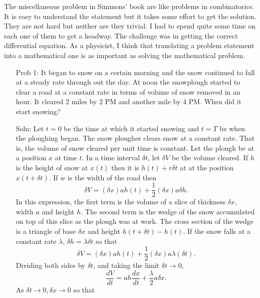 \documentclass{article}
\begin{document}
The miscellaneous problem in Simmons' book are like problems in combinatorics.
It is easy to understand the statement but it takes some effort to get the
solution. They are not hard but neither are they trivial. I had to spend quite
some time on each one of them to get a headway. The challenge was in getting 
the correct differential equation. As a physicist, I think that translating a
problem statement into a mathematical one is as important as solving the 
mathematical problem.

\begin{enumerate}
\item[Prob 1:] It began to snow on a certain morning and the snow continued 
to fall at a steady rate through out the day. At noon the snowplough started 
to clear a road at a constant rate in terms of volume of snow removed in an 
hour. It cleared 2 miles by 2 PM and another mile by 4 PM. When did it start 
snowing?
\item[Soln: ] Let $t = 0$ be the time at which it started snowing and $t = T$
be when the ploughing began. The snow plougher clears snow at a constant rate.
That is, the volume of snow cleared per unit time is constant. Let the plough
be at a position $x$ at time $t$. In a time interval $\delta t$, let $\delta V$
be the volume cleared. If $h$ is the height of snow at $x(t)$ then it is $h(t)
+ r\delta t$ at at the position $x(t + \delta t)$. If $w$ is the width of the
road then 
\begin{equation}\label{e1}
\delta V = (\delta x)ah(t) + \frac{1}{2}(\delta x)a\delta h.
\end{equation}
In this expression, the first term is the volume of a slice of thickness 
$\delta x$, width $a$ and height $h$. The second term is the wedge of the snow
accumulated on top of this slice as the plough was at work. The cross section 
of the wedge is a triangle of base $\delta x$ and height $h(t + \delta t) - 
h(t)$. If the snow falls at a constant rate $\lambda$, $\delta h = \lambda
\delta t$ so that
\begin{equation}\label{e2}
\delta V = (\delta x)ah(t) + \frac{1}{2}(\delta x)a\lambda(\delta t).
\end{equation}
Dividing both sides by $\delta t$, and taking the limit $\delta t \rightarrow 
0$,
\begin{equation}\label{e3}
\frac{dV}{dt} = ah\frac{dx}{dt} + \frac{\lambda}{2} a\delta x.
\end{equation}
As $\delta t \rightarrow 0, \delta x \rightarrow 0$ so that
\begin{equation}\label{e4}

\end{equation}
\end{enumerate}
\end{document}
